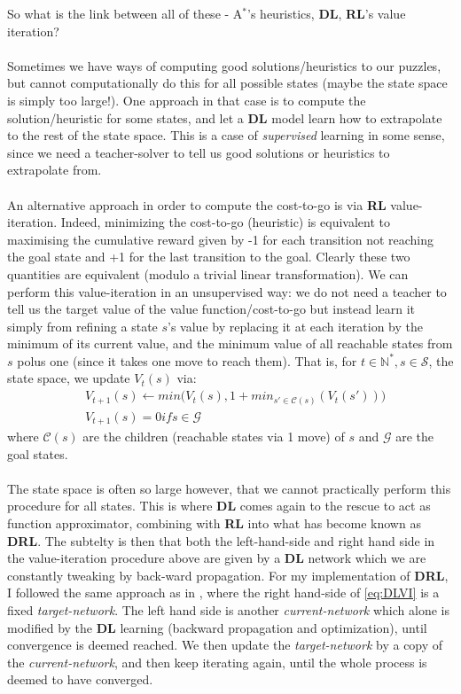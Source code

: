 So what is the link between all of these - A$^{*}$'s heuristics, \textbf{DL}, \textbf{RL}'s value iteration?
\\
\\
Sometimes we have ways of computing good solutions/heuristics to our puzzles, but cannot computationally do this for all possible states (maybe the state space is simply too large!). One approach in that case is to compute the solution/heuristic for some states, and let a \textbf{DL} model learn how to extrapolate to the rest of the state space. This is a case of \textit{supervised} learning in some sense, since we need a teacher-solver to tell us good solutions or heuristics to extrapolate from.
\\
\\
An alternative approach in order to compute the cost-to-go is via \textbf{RL} value-iteration. Indeed, minimizing the cost-to-go (heuristic) is equivalent to maximising the cumulative reward given by -1 for each transition not reaching the goal state and +1 for the last transition to the goal. Clearly these two quantities are equivalent (modulo a trivial linear transformation). We can perform this value-iteration in an unsupervised way: we do not need a teacher to tell us the target value of the value function/cost-to-go but instead learn it simply from refining a state $s$'s value by replacing it at each iteration by the minimum of its current value, and the minimum value of all reachable states from $s$ polus one (since it takes one move to reach them). That is, for $t \in \mathbb{N}^{*}, s \in \mathcal{S}$, the state space, we update $V_{t}(s)$ via:
\begin{equation} \label{eq:DLVI}
\begin{split}
& V_{t+1}(s) \leftarrow min \Big( V_{t}(s), 1 + min_{s' \in \mathcal{C}(s)}(V_{t}(s'))  \Big) \\
& V_{t+1}(s) = 0 if s \in \mathcal{G}
\end{split}
\end{equation}
where $\mathcal{C}(s)$ are the children (reachable states via 1 move) of $s$ and $\mathcal{G}$ are the goal states.
\\
\\
The state space is often so large however, that we cannot practically perform this procedure for all states. This is where \textbf{DL} comes again to the rescue to act as function approximator, combining with \textbf{RL} into what has become known as \textbf{DRL}. The subtelty is then that both the left-hand-side and right hand side in the value-iteration procedure above are given by a \textbf{DL} network which we are constantly tweaking by back-ward propagation. For my implementation of \textbf{DRL}, I followed the same approach as in \cite{Mnih2013}, where the right hand-side of \ref{eq:DLVI} is a fixed \textit{target-network}. The left hand side is another \textit{current-network} which alone is modified by the \textbf{DL} learning (backward propagation and optimization), until convergence is deemed reached. We then update the \textit{target-network} by a copy of the \textit{current-network}, and then keep iterating again, until the whole process is deemed to have converged.
